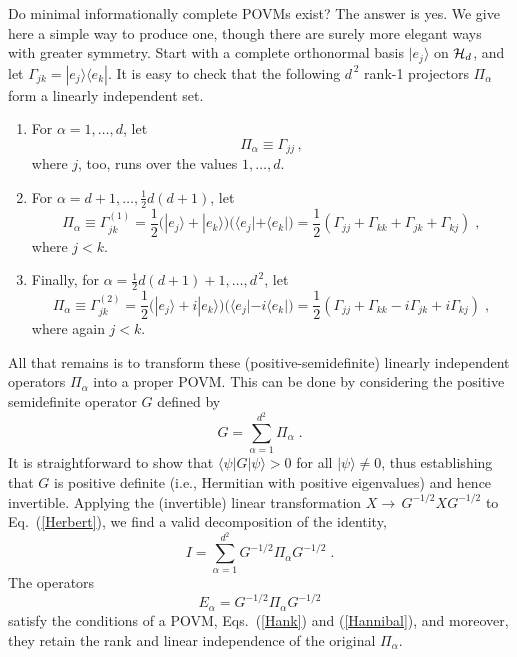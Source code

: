 Do minimal informationally complete POVMs exist?  The answer is
yes. We give here a simple way to produce one, though there are
surely more elegant ways with greater symmetry. Start with a
complete orthonormal basis $|e_j\rangle$ on ${\cal H}_d$, and let
$\Gamma_{jk}=|e_j\rangle\langle e_k|$.  It is easy to check that
the following $d^{\,2}$ rank-1 projectors $\Pi_\alpha$ form a
linearly independent set.
\begin{enumerate}
\item For $\alpha=1,\ldots,d$, let
\begin{equation}
\Pi_\alpha \equiv \Gamma_{jj}\,,
\end{equation}
where $j$, too, runs over the values $1,\ldots,d$.

\item For $\alpha=d+1,\ldots,\frac{1}{2}d(d+1)$, let
\begin{equation}
\Pi_\alpha \equiv \Gamma^{(1)}_{jk} =
\frac{1}{2}\Big(|e_j\rangle+|e_k\rangle\Big)
\Big(\langle e_j|+\langle e_k|\Big)
=
\frac{1}{2}(\Gamma_{jj}+\Gamma_{kk}+\Gamma_{jk}+\Gamma_{kj})\;,
\end{equation}
where $j<k$.

\item Finally, for $\alpha= \frac{1}{2}d(d+1) + 1, \ldots,d^{\,2}$, let
\begin{equation}
\Pi_\alpha \equiv \Gamma^{(2)}_{jk}
= \frac{1}{2}\Big(|e_j\rangle+i|e_k\rangle\Big)
\Big(\langle e_j|-i\langle e_k |\Big)
=\frac{1}{2}(\Gamma_{jj}+\Gamma_{kk}-i\Gamma_{jk}+i\Gamma_{kj})\;,
\end{equation}
where again $j<k$.
\end{enumerate}
All that remains is to transform these (positive-semidefinite)
linearly independent operators $\Pi_\alpha$ into a proper POVM.
This can be done by considering the positive semidefinite operator
$G$ defined by
\begin{equation}
G=\sum_{\alpha=1}^{d^2}\Pi_\alpha\;.
\label{Herbert}
\end{equation}
It is straightforward to show that $\langle\psi|G|\psi\rangle>0$
for all $|\psi\rangle\ne0$, thus establishing that $G$ is positive
definite (i.e., Hermitian with positive eigenvalues) and hence
invertible.  Applying the (invertible) linear transformation
$X\rightarrow\, G^{-1/2}XG^{-1/2}$ to Eq.~(\ref{Herbert}), we find
a valid decomposition of the identity,
\begin{equation}
I=\sum_{\alpha=1}^{d^2}G^{-1/2}\Pi_\alpha G^{-1/2}\;.
\end{equation}
The operators
\begin{equation}
E_\alpha=G^{-1/2}\Pi_\alpha G^{-1/2}
\end{equation}
satisfy the conditions of a POVM, Eqs.~(\ref{Hank}) and
(\ref{Hannibal}), and moreover, they retain the rank and
linear independence of the original $\Pi_\alpha$.

